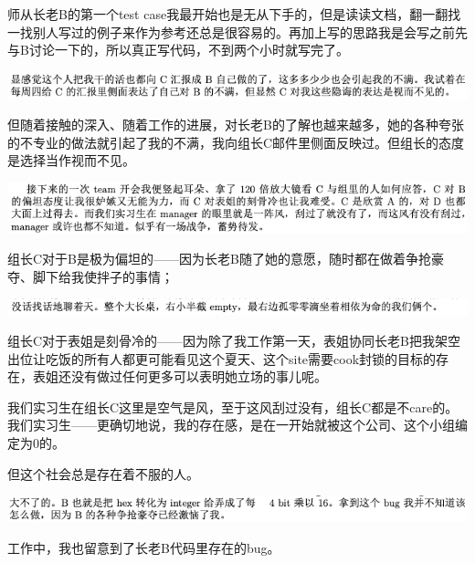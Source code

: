 \documentclass[9pt, b5paper]{article}
\begin{document}
师从长老B的第一个test case我最开始也是无从下手的，但是读读文档，翻一翻找一找别人写过的例子来作为参考还总是很容易的。再加上写的思路我是会写之前先与B讨论一下的，所以真正写代码，不到两个小时就写完了。 

\begin{center}
\includegraphics[width=.9\linewidth]{./pic/backups_plans_20210504_231201.png}
\end{center}

但随着接触的深入、随着工作的进展，对长老B的了解也越来越多，她的各种夸张的不专业的做法就引起了我的不满，我向组长C邮件里侧面反映过。但组长的态度是选择当作视而不见。 

\begin{center}
\includegraphics[width=.9\linewidth]{./pic/backups_plans_20210504_231233.png}
\end{center}

组长C对于B是极为偏坦的——因为长老B随了她的意愿，随时都在做着争抢豪夺、脚下给我使拌子的事情；

\begin{center}
\includegraphics[width=.9\linewidth]{./pic/backups_plans_20210505_125854.png}
\end{center}

组长C对于表姐是刻骨冷的——因为除了我工作第一天，表姐协同长老B把我架空出位让吃饭的所有人都更可能看见这个夏天、这个site需要cook封锁的目标的存在，表姐还没有做过任何更多可以表明她立场的事儿呢。

我们实习生在组长C这里是空气是风，至于这风刮过没有，组长C都是不care的。我们实习生——更确切地说，我的存在感，是在一开始就被这个公司、这个小组编定为0的。

但这个社会总是存在着不服的人。 

\begin{center}
\includegraphics[width=.9\linewidth]{./pic/backups_plans_20210504_231258.png}
\end{center}

工作中，我也留意到了长老B代码里存在的bug。
\end{document}
